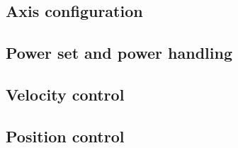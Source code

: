 %	
\subsection{Axis configuration}

%	
\subsection{Power set and power handling}

%	
\subsection{Velocity control}

%	
\subsection{Position control}




